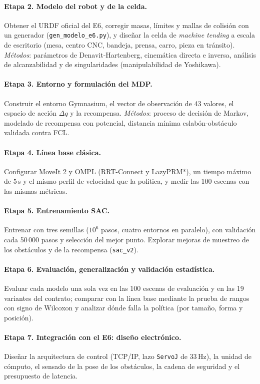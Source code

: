 \documentclass[11pt,a4paper,twoside]{article}
\begin{document}
\paragraph{Etapa 2. Modelo del robot y de la celda.} Obtener el URDF oficial del E6, corregir masas, límites y mallas de colisión con un generador (\texttt{gen\_modelo\_e6.py}), y diseñar la celda de \emph{machine tending} a escala de escritorio (mesa, centro CNC, bandeja, prensa, carro, pieza en tránsito). \emph{Métodos}: parámetros de Denavit-Hartenberg, cinemática directa e inversa, análisis de alcanzabilidad y de singularidades (manipulabilidad de Yoshikawa).

\paragraph{Etapa 3. Entorno y formulación del MDP.} Construir el entorno Gymnasium, el vector de observación de 43 valores, el espacio de acción $\Delta q$ y la recompensa. \emph{Métodos}: proceso de decisión de Markov, modelado de recompensa con potencial, distancia mínima eslabón-obstáculo validada contra FCL.

\paragraph{Etapa 4. Línea base clásica.} Configurar MoveIt 2 y OMPL (RRT-Connect y LazyPRM*), un tiempo máximo de 5\,s y el mismo perfil de velocidad que la política, y medir las 100 escenas con las mismas métricas.

\paragraph{Etapa 5. Entrenamiento SAC.} Entrenar con tres semillas ($10^6$ pasos, cuatro entornos en paralelo), con validación cada 50\,000 pasos y selección del mejor punto. Explorar mejoras de muestreo de los obstáculos y de la recompensa (\texttt{sac\_v2}).

\paragraph{Etapa 6. Evaluación, generalización y validación estadística.} Evaluar cada modelo una sola vez en las 100 escenas de evaluación y en las 19 variantes del contrato; comparar con la línea base mediante la prueba de rangos con signo de Wilcoxon y analizar dónde falla la política (por tamaño, forma y posición).

\paragraph{Etapa 7. Integración con el E6: diseño electrónico.} Diseñar la arquitectura de control (TCP/IP, lazo \texttt{ServoJ} de 33\,Hz), la unidad de cómputo, el sensado de la pose de los obstáculos, la cadena de seguridad y el presupuesto de latencia.
\end{document}
